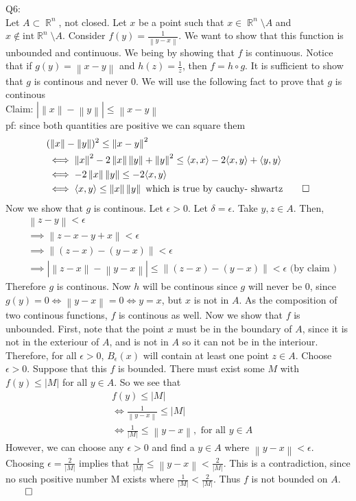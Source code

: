 \documentclass[letterpaper]{article}
\DeclareMathOperator{\R}{\mathbb{R}}
\newcommand{\lan}{\langle}
\newcommand{\ran}{\rangle}
\newcommand{\norm}[1]{\left\lVert#1\right\rVert}
\newcommand{\inn}[1]{\lan#1\ran}
\begin{document}
Q6:
\\
Let $A\subset \R^n$, not closed. Let $x$ be a point such that $x \in \R^n \setminus A$ and $x\notin \text{int}\R^n \setminus A$. Consider $f(y) = \frac{1}{\norm{y-x}}$. We want to show that this function is unbounded and continuous.
We being by showing that $f$ is continuous. Notice that if $g(y) = \norm{x-y}$ and $h(z)= \frac{1}{z}$, then $f = h \circ g$. It is sufficient to show that $g$ is continous and never 0. We will use the following fact to prove that $g$ is continous
\\ Claim: $|\norm{x}-\norm{y}| \leq \norm{x-y}$
\\ pf: since both quantities are positive we can square them
\begin{align*}
    & (\norm{x}-\norm{y})^2 \leq \norm{x-y}^2
    \\ & \iff \norm{x}^2 - 2\norm{x}\norm{y} + \norm{y}^2 \leq \inn{x,x} -2 \inn{x,y} + \inn{y,y}
    \\ & \iff -2 \norm{x} \norm{y} \leq -2 \inn{x,y}
    \\ & \iff \inn{x,y} \leq \norm{x} \norm{y} \text{ which is true by cauchy- shwartz} \qed
\end{align*}
Now we show that $g$ is continous. Let $\epsilon >0$. Let $\delta = \epsilon$. Take $y,z \in A$. Then, 
\begin{align*}
    & \norm{z-y} < \epsilon 
    \\ & \implies \norm{z-x-y+x} < \epsilon
    \\ & \implies \norm{(z-x) - (y-x)} < \epsilon
    \\ & \implies |\norm{z-x}- \norm{y-x}| \leq \norm{(z-x)-(y-x)} < \epsilon \text{ (by claim )}
\end{align*} Therefore $g$ is continous. Now $h$ will be continous since $g$ will never be 0, since $g(y)=0 \iff \norm{y-x} = 0 \iff y=x$, but $x$ is not in $A$. As the composition of two continous functions, $f$ is continous as well. 
 Now we show that $f$ is unbounded. First, note that the point $x$ must be in the boundary of $A$, since it is not in the exteriour of $A$, and is not in $A$ so it can not be in the interiour. 
Therefore, for all $\epsilon >0$, $B_{\epsilon}(x)$ will contain at least one point $z \in A$. Choose $\epsilon > 0$. Suppose that this $f$ is bounded. There must exist some $M$ with $f(y) \leq |M|$ for all $y \in A$. So we see that 
\begin{align*}
    & f(y) \leq |M|
    \\ & \iff \frac{1}{\norm{y-x}} \leq |M|
    \\ & \iff \frac{1}{|M|} \leq \norm{y-x}, \text{ for all } y \in A
\end{align*}
However, we can choose any $\epsilon>0$ and find a $y\in A$ where $\norm{y-x} < \epsilon$. Choosing $\epsilon = \frac{2}{|M|}$ implies that $\frac{1}{|M|} \leq \norm{y-x} < \frac{2}{|M|}$. This is a contradiction, since no such positive number M exists where $\frac{1}{|M|} < \frac{2}{|M|}$. Thus $f$ is not bounded on $A$.$\qed$
\end{document}
